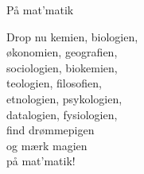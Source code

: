 \begin{song}{På mat'matik}
  \begin{SBSection*}
    Drop nu kemien, biologien,\\
    økonomien, geografien,\\
    sociologien, biokemien,\\
    teologien, filosofien,\\\medskip
    etnologien, psykologien,\\
    datalogien, fysiologien,\\
    find drømmepigen\\
    og mærk magien\\
    på mat’matik!
  \end{SBSection*}
\end{song}